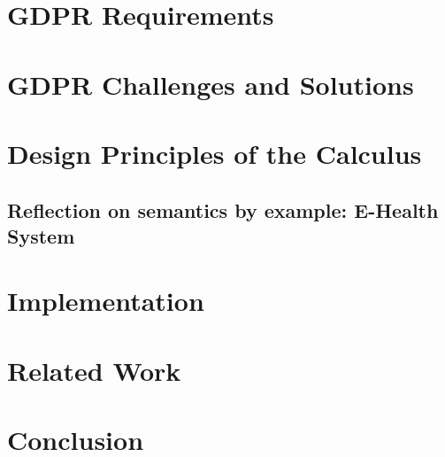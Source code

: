\documentclass[conference]{IEEEtran}
\begin{document}
\section{GDPR Requirements}
\label{sec:GDPRintro}

\vspace{-1mm}
\section{GDPR Challenges and Solutions}
\label{sec:gdprchal}

\section{Design Principles of the Calculus }
\label{sec:langsyntax}

\vspace{-5mm}
\subsection{Reflection on semantics by example: E-Health System}
\label{sec:casestudy}

\vspace{-3mm}
\section{Implementation}
\label{sec:implem}


\section{Related Work }
\label{sec:related}

\section{Conclusion }
\label{sec:conclusion}



  
\end{document}
